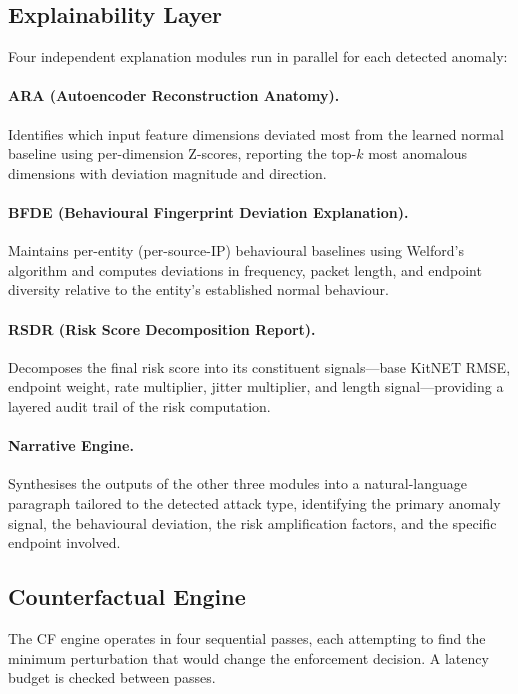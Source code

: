 \documentclass[preprint,12pt,authoryear]{elsarticle}
\begin{document}
\subsection{Explainability Layer}
\label{subsec:explainability}

Four independent explanation modules run in parallel for each detected anomaly:

\paragraph{ARA (Autoencoder Reconstruction Anatomy).}
Identifies which input feature dimensions deviated most from the learned normal
baseline using per-dimension Z-scores, reporting the top-$k$ most anomalous
dimensions with deviation magnitude and direction.

\paragraph{BFDE (Behavioural Fingerprint Deviation Explanation).}
Maintains per-entity (per-source-IP) behavioural baselines using Welford's
algorithm and computes deviations in frequency, packet length, and endpoint
diversity relative to the entity's established normal behaviour.

\paragraph{RSDR (Risk Score Decomposition Report).}
Decomposes the final risk score into its constituent signals---base KitNET RMSE,
endpoint weight, rate multiplier, jitter multiplier, and length signal---providing
a layered audit trail of the risk computation.

\paragraph{Narrative Engine.}
Synthesises the outputs of the other three modules into a natural-language
paragraph tailored to the detected attack type, identifying the primary anomaly
signal, the behavioural deviation, the risk amplification factors, and the
specific endpoint involved.

\subsection{Counterfactual Engine}
\label{subsec:cf_engine}

The CF engine operates in four sequential passes, each attempting to find the
minimum perturbation that would change the enforcement decision. A latency budget
is checked between passes.
\end{document}
